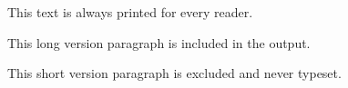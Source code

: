 \documentclass{article}
\begin{document}
This text is always printed for every reader.
\begin{longform}
This long version paragraph is included in the output.
\end{longform}
\begin{shortform}
This short version paragraph is excluded and never typeset.
\end{shortform}
\end{document}
